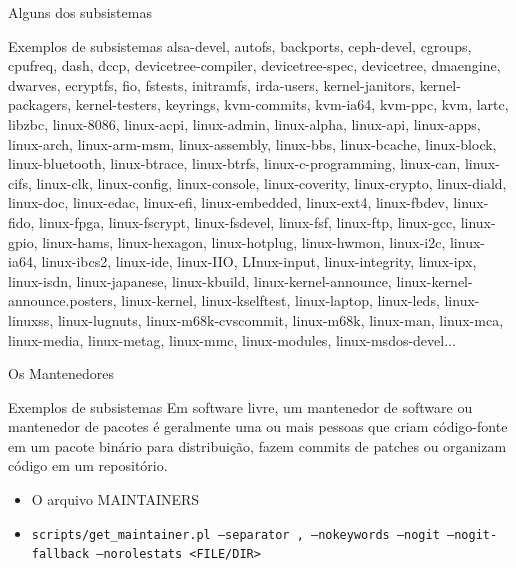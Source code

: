 \documentclass[10pt, compress, aspectratio=169]{beamer}
\begin{document}
\begin{frame}{Alguns dos subsistemas}
  \begin{exampleblock}{Exemplos de subsistemas}
alsa-devel, autofs, backports, ceph-devel, cgroups, cpufreq, dash,
dccp, devicetree-compiler, devicetree-spec, devicetree, dmaengine,
dwarves, ecryptfs, fio, fstests, initramfs, irda-users, kernel-janitors,
kernel-packagers, kernel-testers, keyrings, kvm-commits, kvm-ia64,
kvm-ppc,   kvm,   lartc,   libzbc,   linux-8086,   linux-acpi,   linux-admin,
linux-alpha,   linux-api,   linux-apps,   linux-arch,   linux-arm-msm,
linux-assembly,   linux-bbs,   linux-bcache,   linux-block,   linux-bluetooth,
linux-btrace,   linux-btrfs,   linux-c-programming,   linux-can,   linux-cifs,
linux-clk,   linux-config,   linux-console,   linux-coverity,   linux-crypto,
linux-diald,   linux-doc,   linux-edac,   linux-efi,   linux-embedded,
linux-ext4,   linux-fbdev,   linux-fido,   linux-fpga,   linux-fscrypt,
linux-fsdevel,   linux-fsf,   linux-ftp,   linux-gcc,   linux-gpio,
linux-hams,   linux-hexagon,   linux-hotplug,   linux-hwmon,   linux-i2c,
linux-ia64,   linux-ibcs2,   linux-ide,   linux-IIO,   LInux-input,
linux-integrity,   linux-ipx,   linux-isdn,   linux-japanese,   linux-kbuild,
linux-kernel-announce,   linux-kernel-announce.posters,   linux-kernel,
linux-kselftest,   linux-laptop,   linux-leds,   linux-linuxss,
linux-lugnuts,   linux-m68k-cvscommit,   linux-m68k,   linux-man,   linux-mca,
linux-media, linux-metag,   linux-mmc,   linux-modules,   linux-msdos-devel...
  \end{exampleblock}
\end{frame}

\begin{frame}{Os Mantenedores}

  \begin{exampleblock}{Exemplos de subsistemas}
Em software livre, um mantenedor de software ou mantenedor de pacotes é
geralmente uma ou mais pessoas que criam código-fonte em um pacote binário para
distribuição, fazem commits de patches ou organizam código em um repositório.
  \end{exampleblock}

  \begin{itemize}
    \item O arquivo MAINTAINERS
    \item \texttt{scripts/get\_maintainer.pl --separator , --nokeywords --nogit --nogit-fallback --norolestats <FILE/DIR>}
  \end{itemize}
\end{frame}
\end{document}
